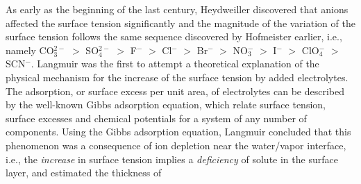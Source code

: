 As early as the beginning of the last century, Heydweiller discovered that anions affected the surface tension significantly
and the magnitude of the variation of the surface tension follows the same sequence discovered by Hofmeister earlier\cite{dosSantos10},
i.e., namely 
CO$_3^{2-}$ $>$  SO$_4^{2-}$ $>$ F$^-$ $>$ Cl$^-$ $>$ Br$^-$ $>$ NO$_3^-$ $>$ I$^-$ $>$ ClO$_4^-$ $>$ SCN$^-$\cite{Jungwirth2006,Pegram2007,ZhangJY2010,Tobias2008,Parsons2011,HuaWei2013}. 
Langmuir\cite{Langmuir1917} was the first to attempt a theoretical explanation of the physical mechanism for the increase of the surface tension by added electrolytes.
The adsorption, or surface excess per unit area, of electrolytes can be described by the well-known Gibbs adsorption equation, which relate 
surface tension, surface excesses and chemical potentials for a system of any number of components.
Using the Gibbs adsorption equation, Langmuir concluded that this phenomenon was a consequence of ion depletion 
near the water/vapor interface, i.e., the \emph{increase} in surface tension 
implies a \emph{deficiency} of solute in the surface layer\cite{Jarvis1968},
and estimated the thickness of 
